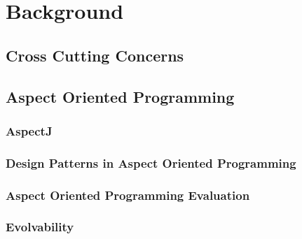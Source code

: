 \chapter{Background}\label{Background}

\section{Cross Cutting Concerns}\label{Cross Cutting Concerns}

\section{Aspect Oriented Programming}\label{Aspect Oriented Programming}

\subsection{AspectJ}\label{AspectJ}

\subsection{Design Patterns in Aspect Oriented Programming}\label{Design Patterns in Aspect Oriented Programming}

\subsection{Aspect Oriented Programming Evaluation}\label{Aspect Oriented Programming Evaluation}

\subsection{Evolvability}\label{Aspect Oriented Programming Evolvability}

